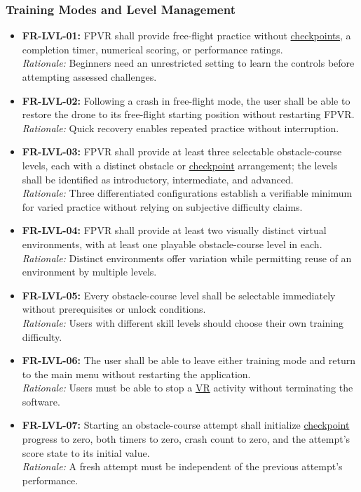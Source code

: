 \documentclass[12pt]{article}
\begin{document}
\subsubsection{Training Modes and Level Management}
\label{sec:s2-levels}
\begin{itemize}
\item \hypertarget{req:FR-LVL-01}{}\textbf{FR-LVL-01:} FPVR shall provide free-flight practice without \hyperlink{glos:Checkpoint}{checkpoints}, a completion timer, numerical scoring, or performance ratings.\\
\textit{Rationale:} Beginners need an unrestricted setting to learn the controls before attempting assessed challenges.
\item \hypertarget{req:FR-LVL-02}{}\textbf{FR-LVL-02:} Following a crash in free-flight mode, the user shall be able to restore the drone to its free-flight starting position without restarting FPVR.\\
\textit{Rationale:} Quick recovery enables repeated practice without interruption.
\item \hypertarget{req:FR-LVL-03}{}\textbf{FR-LVL-03:} FPVR shall provide at least three selectable obstacle-course levels, each with a distinct obstacle or \hyperlink{glos:Checkpoint}{checkpoint} arrangement; the levels shall be identified as introductory, intermediate, and advanced.\\
\textit{Rationale:} Three differentiated configurations establish a verifiable minimum for varied practice without relying on subjective difficulty claims.
\item \hypertarget{req:FR-LVL-04}{}\textbf{FR-LVL-04:} FPVR shall provide at least two visually distinct virtual environments, with at least one playable obstacle-course level in each.\\
\textit{Rationale:} Distinct environments offer variation while permitting reuse of an environment by multiple levels.
\item \hypertarget{req:FR-LVL-05}{}\textbf{FR-LVL-05:} Every obstacle-course level shall be selectable immediately without prerequisites or unlock conditions.\\
\textit{Rationale:} Users with different skill levels should choose their own training difficulty.
\item \hypertarget{req:FR-LVL-06}{}\textbf{FR-LVL-06:} The user shall be able to leave either training mode and return to the main menu without restarting the application.\\
\textit{Rationale:} Users must be able to stop a \hyperlink{glos:VR}{VR} activity without terminating the software.
\item \hypertarget{req:FR-LVL-07}{}\textbf{FR-LVL-07:} Starting an obstacle-course attempt shall initialize \hyperlink{glos:Checkpoint}{checkpoint} progress to zero, both timers to zero, crash count to zero, and the attempt's score state to its initial value.\\
\textit{Rationale:} A fresh attempt must be independent of the previous attempt's performance.
\end{itemize}
\end{document}
